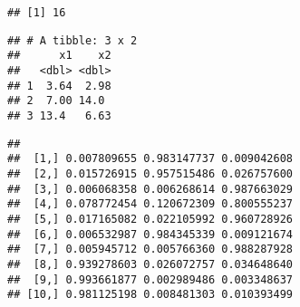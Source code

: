 \documentclass[]{book}
\newenvironment{Shaded}{\begin{snugshade}}{\end{snugshade}}
\newcommand{\DataTypeTok}[1]{\textcolor[rgb]{0.13,0.29,0.53}{#1}}
\newcommand{\DecValTok}[1]{\textcolor[rgb]{0.00,0.00,0.81}{#1}}
\newcommand{\KeywordTok}[1]{\textcolor[rgb]{0.13,0.29,0.53}{\textbf{#1}}}
\newcommand{\NormalTok}[1]{#1}
\newcommand{\OperatorTok}[1]{\textcolor[rgb]{0.81,0.36,0.00}{\textbf{#1}}}
\newcommand{\StringTok}[1]{\textcolor[rgb]{0.31,0.60,0.02}{#1}}
\begin{document}
\begin{Shaded}
\end{Shaded}

\begin{verbatim}
## [1] 16
\end{verbatim}

\begin{Shaded}
\end{Shaded}

\begin{verbatim}
## # A tibble: 3 x 2
##      x1    x2
##   <dbl> <dbl>
## 1  3.64  2.98
## 2  7.00 14.0 
## 3 13.4   6.63
\end{verbatim}

\begin{Shaded}
\end{Shaded}

\begin{verbatim}
##                                          
##  [1,] 0.007809655 0.983147737 0.009042608
##  [2,] 0.015726915 0.957515486 0.026757600
##  [3,] 0.006068358 0.006268614 0.987663029
##  [4,] 0.078772454 0.120672309 0.800555237
##  [5,] 0.017165082 0.022105992 0.960728926
##  [6,] 0.006532987 0.984345339 0.009121674
##  [7,] 0.005945712 0.005766360 0.988287928
##  [8,] 0.939278603 0.026072757 0.034648640
##  [9,] 0.993661877 0.002989486 0.003348637
## [10,] 0.981125198 0.008481303 0.010393499
\end{verbatim}

\begin{Shaded}
\end{Shaded}
\end{document}
